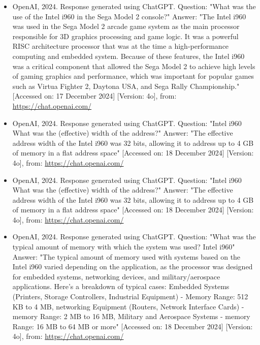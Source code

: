 \documentclass{article}
\begin{document}
\begin{itemize}
\item OpenAI, 2024. Response generated using ChatGPT. Question: "What was the use of the Intel i960 in the Sega Model 2 console?" Answer: "The Intel i960 was used in the Sega Model 2 arcade game system as the main processor responsible for 3D graphics processing and game logic. It was a powerful RISC architecture processor that was at the time a high-performance computing and embedded system. Because of these features, the Intel i960 was a critical component that allowed the Sega Model 2 to achieve high levels of gaming graphics and performance, which was important for popular games such as Virtua Fighter 2, Daytona USA, and Sega Rally Championship." [Accessed on: 17 December 2024] [Version: 4o], from: \url{https://chat.openai.com/}

\item OpenAI, 2024. Response generated using ChatGPT. Question: "Intel i960 What was  the (effective) width of the address?" Answer: "The effective address width of the Intel i960 was 32 bits, allowing it to address up to 4 GB of memory in a flat address space" [Accessed on: 18 December 2024] [Version: 4o], from: \url{https://chat.openai.com/}

\item OpenAI, 2024. Response generated using ChatGPT. Question: "Intel i960 What was  the (effective) width of the address?" Answer: "The effective address width of the Intel i960 was 32 bits, allowing it to address up to 4 GB of memory in a flat address space" [Accessed on: 18 December 2024] [Version: 4o], from: \url{https://chat.openai.com/}

\item OpenAI, 2024. Response generated using ChatGPT. Question: "What was the typical amount of memory with which the system was used? Intel i960" Answer: "The typical amount of memory used with systems based on the Intel i960 varied depending on the application, as the processor was designed for embedded systems, networking devices, and military/aerospace applications. Here’s a breakdown of typical cases: Embedded Systems (Printers, Storage Controllers, Industrial Equipment) - Memory Range: 512 KB to 4 MB, networking Equipment (Routers, Network Interface Cards) - memory Range: 2 MB to 16 MB, Military and Aerospace Systems - memory Range: 16 MB to 64 MB or more" [Accessed on: 18 December 2024] [Version: 4o], from: \url{https://chat.openai.com/}

\end{itemize}
\end{document}
